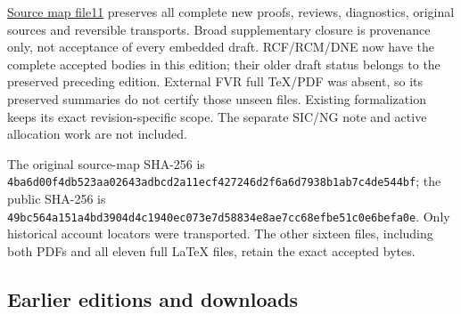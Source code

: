 \documentclass[
]{article}
\begin{document}
\href{https://github.com/KokunoYumeto/zeta-function-research-reader/blob/b4076eb15afd6b036a8de62d67b88eef03efeb50/workbenches/splitzero-tandem/continuations/20260915-dual-metric-continuation/11_SOURCE_MAP.json}{Source
map file11} preserves all complete new proofs, reviews, diagnostics,
original sources and reversible transports. Broad supplementary closure
is provenance only, not acceptance of every embedded draft. RCF/RCM/DNE
now have the complete accepted bodies in this edition; their older draft
status belongs to the preserved preceding edition. External FVR full
TeX/PDF was absent, so its preserved summaries do not certify those
unseen files. Existing formalization keeps its exact revision-specific
scope. The separate SIC/NG note and active allocation work are not
included.

The original source-map SHA-256 is
\texttt{4ba6d00f4db523aa02643adbcd2a11ecf427246d2f6a6d7938b1ab7c4de544bf};
the public SHA-256 is
\texttt{49bc564a151a4bd3904d4c1940ec073e7d58834e8ae7cc68efbe51c0e6befa0e}.
Only historical account locators were transported. The other sixteen
files, including both PDFs and all eleven full LaTeX files, retain the
exact accepted bytes.

\subsection{Earlier editions and
downloads}\label{earlier-editions-and-downloads-1}
\end{document}
